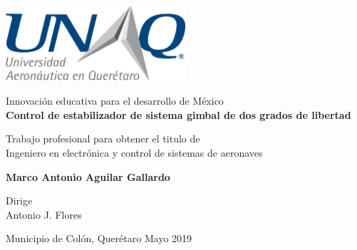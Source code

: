 
\setcounter{page}{1}

\newpage

\thispagestyle{empty}
\begin{center}
   \begin{center}
   \includegraphics[width=0.5\textwidth]{DU_2-col_sml.eps}
   \end{center}
     \vspace*{1.5cm}
     
       {\LARGE Innovaci\'on educativa para el desarrollo de M\'exico}\\
       
       \vspace*{1.5cm}
  {\LARGE \bf Control de estabilizador de sistema gimbal de dos grados de libertad}

  \vspace*{1.5cm}

    {\Large Trabajo profesional para obtener el titulo de \\
         [1mm] Ingeniero en electr\'onica y control de sistemas de aeronaves}

  \vspace*{1.5cm}

  {\LARGE\bf Marco Antonio Aguilar Gallardo}
         
         \vspace*{1.5cm}
                  
           {\Large Dirige \\
         [1mm] Antonio J. Flores}


\end{center}
\vfill
  {Municipio de Col\'on, Quer\'etaro} \hfill  Mayo 2019



